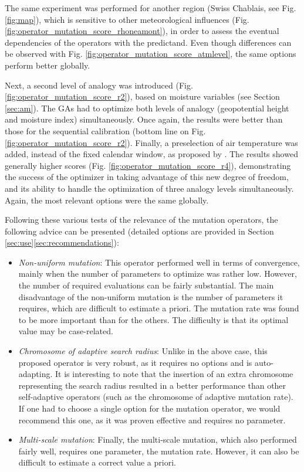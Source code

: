 \documentclass{ametsoc}
\begin{document}
The same experiment was performed for another region (Swiss Chablais, see Fig. \ref{fig:map}), which is sensitive to other meteorological influences (Fig. \ref{fig:operator_mutation_score_rhoneamont}), in order to assess the eventual dependencies of the operators with the predictand. Even though differences can be observed with Fig. \ref{fig:operator_mutation_score_atmlevel}, the same options perform better globally.

Next, a second level of analogy was introduced (Fig. \ref{fig:operator_mutation_score_r2}), based on moisture variables (see Section \ref{sec:am}). The GAs had to optimize both levels of analogy (geopotential height and moisture index) simultaneously. Once again, the results were better than those for the sequential calibration (bottom line on Fig. \ref{fig:operator_mutation_score_r2}). Finally, a preselection of air temperature was added, instead of the fixed calendar window, as proposed by \cite{BenDaoud2016}. The results showed generally higher scores (Fig. \ref{fig:operator_mutation_score_r4}), demonstrating the success of the optimizer in taking advantage of this new degree of freedom, and its ability to handle the optimization of three analogy levels simultaneously. Again, the most relevant options were the same globally.

Following these various tests of the relevance of the mutation operators, the following advice can be presented (detailed options are provided in Section \ref{sec:use}\ref{sec:recommendations}):

\begin{itemize}
	
	\item \textit{Non-uniform mutation}: This operator performed well in terms of convergence, mainly when the number of parameters to optimize was rather low. However, the number of required evaluations can be fairly substantial. The main disadvantage of the non-uniform mutation is the number of parameters it requires, which are difficult to estimate a priori. The mutation rate was found to be more important than for the others. The difficulty is that its optimal value may be case-related.
	
	\item \textit{Chromosome of adaptive search radius}: Unlike in the above case, this proposed operator is very robust, as it requires no options and is auto-adapting. It is interesting to note that the insertion of an extra chromosome representing the search radius resulted in a better performance than other self-adaptive operators (such as the chromosome of adaptive mutation rate). If one had to choose a single option for the mutation operator, we would recommend this one, as it was proven effective and requires no parameter.
	
	\item \textit{Multi-scale mutation}: Finally, the multi-scale mutation, which also performed fairly well, requires one parameter, the mutation rate. However, it can also be difficult to estimate a correct value a priori.
	
\end{itemize}
\end{document}
